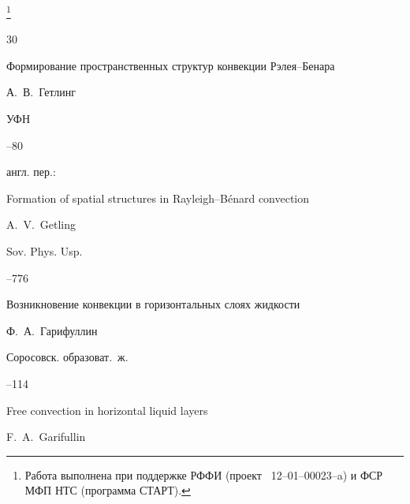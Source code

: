{\thanks{Работа выполнена при поддержке РФФИ (проект \No~12--01--00023--a) и ФСР МФП НТС (программа СТАРТ).}



\vspace{-3mm}









\begin{thebibliography}{30}




\paper Формирование пространственных структур конвекции Рэлея--Бенара

\by А.~В.~Гетлинг

\jour УФН




--80

\transl

англ. пер.:~

\paper Formation of spatial structures in Rayleigh--B\'enard convection

\by A.~V.~Getling


\jour Sov. Phys. Usp. 



–776 







\paper Возникновение конвекции в горизонтальных слоях жидкости

\by Ф.~А.~Гарифуллин

\jour Соросовск. образоват.~ж.




--114

\misctransl

\paper Free convection in horizontal liquid layers

\by F.~A.~Garifullin


\end{thebibliography}}

